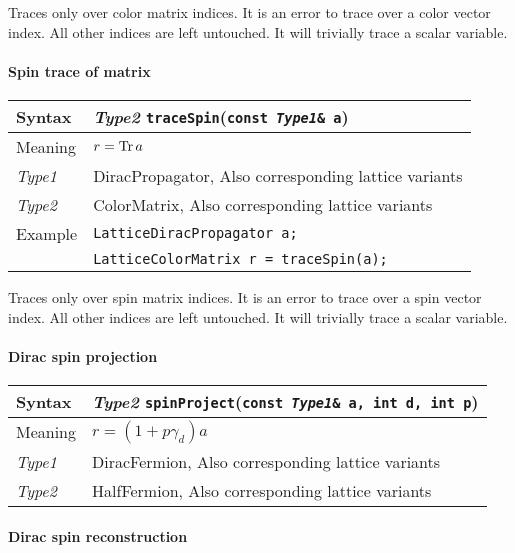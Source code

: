 \documentclass[12pt,letterpaper]{article}
\newcommand{\Tr}{\mathop{\rm Tr}}
\newcommand{\tLatticeColorMatrix}{LatticeColorMatrix}
\newcommand{\tLatticeDiracPropagator}{LatticeDiracPropagator}
\newcommand{\tColorMatrix}{ColorMatrix}
\newcommand{\tHalfFermion}{HalfFermion}
\newcommand{\tDiracFermion}{DiracFermion}
\newcommand{\tDiracPropagator}{DiracPropagator}
\newcommand{\simLatticeVariants}{Also corresponding lattice variants}
\begin{document}
Traces only over color matrix indices. It is an error to trace over a color vector index.
All other indices are left untouched.
It will trivially trace a scalar variable.

\paragraph{Spin trace of matrix}

\begin{flushleft}
  \begin{tabular}{|l|l|}
  \hline
  Syntax      & {\it Type2} \verb|traceSpin|({\tt const {\it Type1}\& a})\\
  \hline
  Meaning     & $r = \Tr a$ \\
  \hline
  {\it Type1} & \tDiracPropagator, \simLatticeVariants\\
  {\it Type2} & \tColorMatrix, \simLatticeVariants\\
  \hline
  \hline
  Example     & {\tt \tLatticeDiracPropagator{} a;}\\
              & {\tt \tLatticeColorMatrix{} r = traceSpin(a);} \\
  \hline
  \end{tabular}
\end{flushleft}

Traces only over spin matrix indices. It is an error to trace over a
spin vector index.  All other indices are left untouched.  It will
trivially trace a scalar variable.

\paragraph{Dirac spin projection}

\begin{flushleft}
  \begin{tabular}{|l|l|}
  \hline 
  Syntax      & {\it Type2} \verb|spinProject|({\tt const {\it Type1}\& a, int d, int p})\\
  \hline
  Meaning     & $r = (1 + p\gamma_d)a$\\
  \hline
  {\it Type1} & \tDiracFermion, \simLatticeVariants\\
  {\it Type2} & \tHalfFermion, \simLatticeVariants\\
  \hline
  \end{tabular}
\end{flushleft}

\paragraph{Dirac spin reconstruction}
\end{document}
